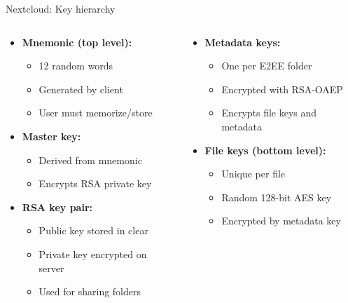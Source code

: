 \documentclass[aspectratio=169, lualatex, handout]{beamer}
\begin{document}
\begin{frame}{Nextcloud: Key hierarchy}
	\begin{columns}[c]
		\begin{column}{0.5\textwidth}
			\begin{itemize}
				\item \textbf{Mnemonic (top level):}
				      \begin{itemize}
					      \item 12 random words
					      \item Generated by client
					      \item User must memorize/store
				      \end{itemize}
				\item \textbf{Master key:}
				      \begin{itemize}
					      \item Derived from mnemonic
					      \item Encrypts RSA private key
				      \end{itemize}
				\item \textbf{RSA key pair:}
				      \begin{itemize}
					      \item Public key stored in clear
					      \item Private key encrypted on server
					      \item Used for sharing folders
				      \end{itemize}
			\end{itemize}
		\end{column}
		\begin{column}{0.5\textwidth}
			\begin{itemize}
				\item \textbf{Metadata keys:}
				      \begin{itemize}
					      \item One per E2EE folder
					      \item Encrypted with RSA-OAEP
					      \item Encrypts file keys and metadata
				      \end{itemize}
				\item \textbf{File keys (bottom level):}
				      \begin{itemize}
					      \item Unique per file
					      \item Random 128-bit AES key
					      \item Encrypted by metadata key
				      \end{itemize}
			\end{itemize}
		\end{column}
	\end{columns}
\end{frame}
\end{document}

